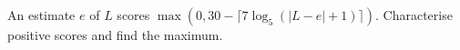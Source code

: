 An estimate $e$ of $L$ scores $\max(0,30-\lceil7\log_5(|L-e|+1)\rceil)$. Characterise positive scores and find the maximum.
